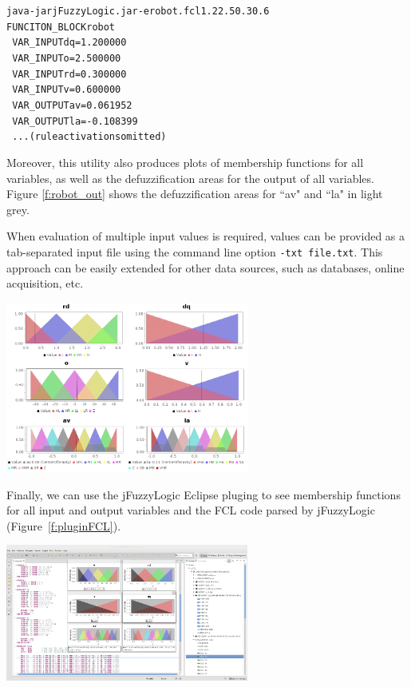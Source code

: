 \documentclass[11pt,twoside]{article}
\begin{document}
\begin{multicols}{2}
\begin{scriptsize}
\begin{alltt}
java -jar jFuzzyLogic.jar -e robot.fcl 1.2 2.5 0.3 0.6
\vspace*{3pt}
FUNCITON_BLOCK robot
\ 	VAR_INPUT 	        dq = 1.200000
\ 	VAR_INPUT 	         o = 2.500000
\ 	VAR_INPUT 	        rd = 0.300000
\ 	VAR_INPUT 	         v = 0.600000
\ 	VAR_OUTPUT	        av = 0.061952
\ 	VAR_OUTPUT	        la = -0.108399
\   ...(rule activations omitted)
\end{alltt}
\end{scriptsize}

Moreover, this utility also produces plots of membership functions for all variables, as well as the defuzzification areas for the output of all variables. Figure \ref{f:robot_out} shows the defuzzification areas for ``av" and ``la" in light grey.

When evaluation of multiple input values is required, values can be provided as a tab-separated input file using the command line option \texttt{-txt file.txt}. This approach can be easily extended for other data sources, such as databases, online acquisition, etc.

\centerline{\includegraphics[width=3.15in]{./figs/robot_out2.png}}
\vspace*{5pt}
\label{f:robot_out}
\vspace*{5pt}


Finally, we can use the jFuzzyLogic Eclipse pluging to see membership functions for all input and output variables and the FCL code parsed by jFuzzyLogic (Figure~\ref{f:pluginFCL}).

\vspace*{5pt}
\centerline{\includegraphics[width=3.15in]{./figs/plugin_optimized_robot.png}}
\vspace*{5pt}
\label{f:pluginFCL}
\vspace*{2pt}

\end{multicols}
\end{document}
